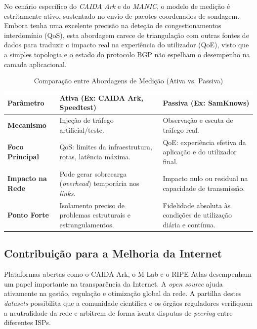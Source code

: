 \documentclass[11pt, a4paper]{article}
\begin{document}
No cenário específico do \textit{CAIDA Ark} e do \textit{MANIC}, o modelo de medição é estritamente ativo, sustentado no envio de pacotes coordenados de sondagem. Embora tenha uma excelente precisão na deteção de congestionamentos interdomínio (QoS), esta abordagem carece de triangulação com outras fontes de dados para traduzir o impacto real na experiência do utilizador (QoE), visto que a simples topologia e o estado do protocolo BGP não espelham o desempenho na camada aplicacional.

\begin{table}[hbt!]
\centering
\caption{Comparação entre Abordagens de Medição (Ativa vs. Passiva)}
\label{tab:comparacao}
\begin{tabular}{@{} >{\raggedright\arraybackslash}p{2.8cm} >{\raggedright\arraybackslash}p{4.5cm} >{\raggedright\arraybackslash}p{4.5cm} @{}}
\toprule
\textbf{Parâmetro} & \textbf{Ativa (Ex: CAIDA Ark, Speedtest)} & \textbf{Passiva (Ex: SamKnows)} \\
\midrule
\textbf{Mecanismo} & Injeção de tráfego artificial/teste. & Observação e escuta de tráfego real. \\
\addlinespace
\textbf{Foco Principal} & QoS: limites da infraestrutura, rotas, latência máxima. & QoE: experiência efetiva da aplicação e do utilizador final. \\
\addlinespace
\textbf{Impacto na Rede} & Pode gerar sobrecarga (\textit{overhead}) temporária nos \textit{links}. & Impacto nulo ou residual na capacidade de transmissão. \\
\addlinespace
\textbf{Ponto Forte} & Isolamento preciso de problemas estruturais e estrangulamentos. & Fidelidade absoluta às condições de utilização diária e contínua. \\
\bottomrule
\end{tabular}
\end{table}

\subsection{Contribuição para a Melhoria da Internet}
Plataformas abertas como o CAIDA Ark, o M-Lab e o RIPE Atlas desempenham um papel importante na transparência da Internet. A \textit{open source} ajuda ativamente na gestão, regulação e otimização global da rede. A partilha destes \textit{datasets} possibilita que a comunidade científica e os órgãos reguladores verifiquem a neutralidade da rede e arbitrem de forma isenta disputas de \textit{peering} entre diferentes ISPs.
\end{document}
